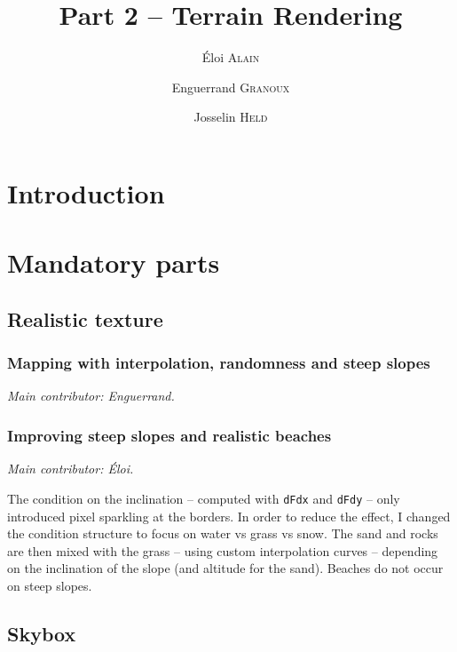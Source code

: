 \documentclass[12pt]{article}
\begin{document}
\title{Part 2 -- Terrain Rendering}
\author{Éloi \textsc{Alain} \and Enguerrand \textsc{Granoux} \and Josselin \textsc{Held}}
\date{}

\maketitle

\tableofcontents

\section{Introduction}



\section{Mandatory parts}

\subsection{Realistic texture}

\subsubsection{Mapping with interpolation, randomness and steep slopes}

{\it Main contributor: Enguerrand.}



\subsubsection{Improving steep slopes and realistic beaches}

{\it Main contributor: Éloi.}

The condition on the inclination -- computed with \texttt{dFdx} and \texttt{dFdy} -- only introduced pixel sparkling at the borders. In order to reduce the effect, I changed the condition structure to focus on water vs grass vs snow. The sand and rocks are then mixed with the grass -- using custom interpolation curves -- depending on the inclination of the slope (and altitude for the sand). Beaches do not occur on steep slopes.
  

\subsection{Skybox}
\end{document}
